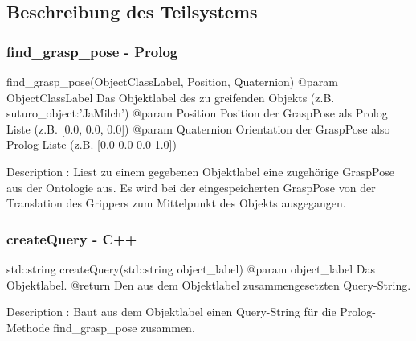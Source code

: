 \documentclass{suturo}
\begin{document}
\begin{figure}[!htb]
\end{figure}
      
\subsection{Beschreibung des Teilsystems}

\subsubsection{find\_grasp\_pose - Prolog}
\begin{spverbatim}
find_grasp_pose(ObjectClassLabel, Position, Quaternion)
@param ObjectClassLabel Das Objektlabel des zu greifenden Objekts 
       (z.B. suturo_object:'JaMilch')
@param Position Position der GraspPose als Prolog Liste (z.B. [0.0, 0.0, 0.0])
@param Quaternion Orientation der GraspPose also Prolog Liste 
       (z.B. [0.0 0.0 0.0 1.0])

Description : Liest zu einem gegebenen Objektlabel eine zugehörige GraspPose aus der Ontologie aus. Es wird bei der eingespeicherten GraspPose von der Translation des Grippers zum Mittelpunkt des Objekts ausgegangen.
\end{spverbatim}

\subsubsection{createQuery - C++}
\begin{spverbatim}
std::string createQuery(std::string object_label)
@param object_label Das Objektlabel.
@return Den aus dem Objektlabel zusammengesetzten Query-String.

Description : Baut aus dem Objektlabel einen Query-String für die Prolog-Methode find_grasp_pose zusammen.
\end{spverbatim}
\end{document}
